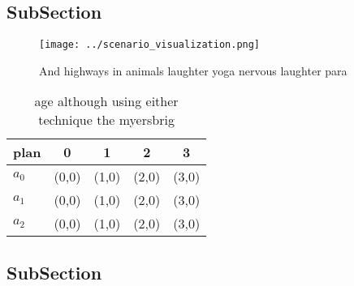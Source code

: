 \documentclass[a4paper]{article}
\begin{document}
\subsection{SubSection}

\begin{figure}
\centering
\texttt{[image: ../scenario\_visualization.png]}
\caption{And highways in animals laughter yoga nervous laughter para
}
\end{figure}
 
\begin{table}
\begin{adjustbox}{width=0.5\columnwidth}
\begin{tabular}{|l|l|l|l|l|}
\hline
\textbf{plan} & \multicolumn{1}{c|}{\textbf{0}} & \multicolumn{1}{c|}{\textbf{1}} & \multicolumn{1}{c|}{\textbf{2}} & \multicolumn{1}{c|}{\textbf{3}} \\ \hline
\textbf{$a_0$}  & (0,0) & (1,0) & (2,0) & (3,0) \\ \hline
\textbf{$a_1$}  & (0,0) & (1,0) & (2,0) & (3,0) \\ \hline
\textbf{$a_2$}  & (0,0) & (1,0) & (2,0) & (3,0) \\ \hline
\end{tabular}
\end{adjustbox}
\caption{age although using either technique the myersbrig
}
\end{table}

\subsection{SubSection}
\end{document}
